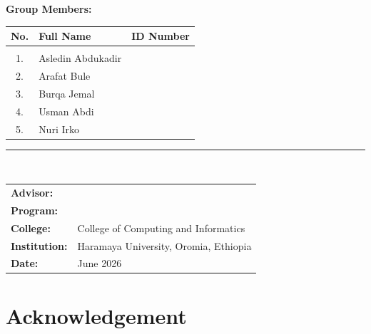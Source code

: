 ﻿\documentclass[12pt, a4paper]{article}
\begin{document}
\begin{titlepage}
\begin{center}
\begin{tcolorbox}[
    enhanced, colback=lightblue, colframe=uniblue,
    arc=4pt, boxrule=1pt, width=0.82\textwidth,
    top=6pt, bottom=6pt, left=10pt, right=10pt
]
\begin{flushleft}
{\bfseries\normalsize\textcolor{uniblue}{Group Members:}}\\[0.2cm]
\begin{tabular}{cll}
\textbf{\textcolor{uniblue}{No.}} & \textbf{\textcolor{uniblue}{Full Name}} & \textbf{\textcolor{uniblue}{ID Number}} \\[3pt]
\hline\\[-7pt]
1. & Asledin Abdukadir &  \\[2pt]
2. & Arafat Bule       &  \\[2pt]
3. & Burqa Jemal       &  \\[2pt]
4. & Usman Abdi        &  \\[2pt]
5. & Nuri Irko         &  \\[2pt]
\end{tabular}
\vspace{0.2cm}
\textcolor{uniblue}{\rule{0.70\textwidth}{0.5pt}}\\[0.15cm]
\begin{tabular}{ll}
\textbf{\textcolor{uniblue}{Advisor:}}     &  \\[2pt]
\textbf{\textcolor{uniblue}{Program:}}     &  \\[2pt]
\textbf{\textcolor{uniblue}{College:}}     & College of Computing and Informatics \\[2pt]
\textbf{\textcolor{uniblue}{Institution:}} & Haramaya University, Oromia, Ethiopia \\[2pt]
\textbf{\textcolor{uniblue}{Date:}}        & June 2026 \\[2pt]
\end{tabular}
\end{flushleft}
\end{tcolorbox}
\end{center}
\end{titlepage}

\newpage
\thispagestyle{plain}
\section*{Acknowledgement}
\end{document}
